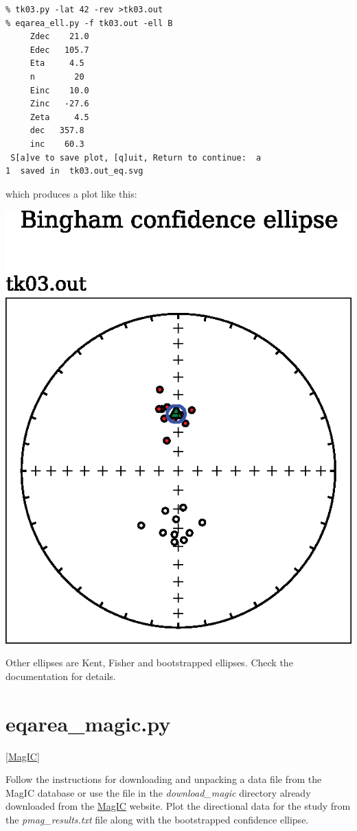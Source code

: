 \documentclass[11pt]{book}
\begin{document}
{{{{\begin{verbatim}
% tk03.py -lat 42 -rev >tk03.out
% eqarea_ell.py -f tk03.out -ell B
     Zdec    21.0
     Edec   105.7
     Eta     4.5
     n        20
     Einc    10.0
     Zinc   -27.6
     Zeta     4.5
     dec   357.8
     inc    60.3
 S[a]ve to save plot, [q]uit, Return to continue:  a
1  saved in  tk03.out_eq.svg
\end{verbatim}

which produces a plot like this:

\includegraphics[width=10 cm]{EPSfiles/eqarea_ell.eps}

Other ellipses are Kent, Fisher and bootstrapped ellipses.  Check the documentation for details.

\section {\bf eqarea\_magic.py} \href{#MagIC}{[MagIC]}

Follow the instructions for downloading and unpacking a data file from the MagIC database or use the file in the {\it download\_magic} directory already downloaded from the  \href{http://earthref.org/MagIC/search}{MagIC} website.    Plot the directional data for the study from the {\it pmag\_results.txt} file along with the bootstrapped 
 confidence ellipse.   

}}}}
\end{document}
